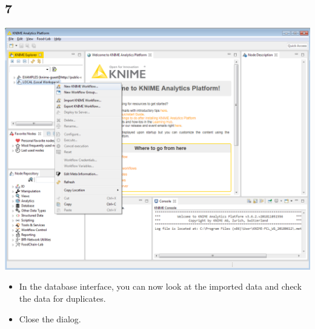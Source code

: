 \documentclass{beamer}
\begin{document}
\subsection{7}
\begin{frame}
	\begin{center}
  		\includegraphics[height=0.6\textheight]{7.png}
	\end{center}
	\begin{itemize}
		\item In the database interface, you can now look at the imported data and check the data for duplicates.
		\item Close the dialog.
	\end{itemize}
\end{frame}
\end{document}
